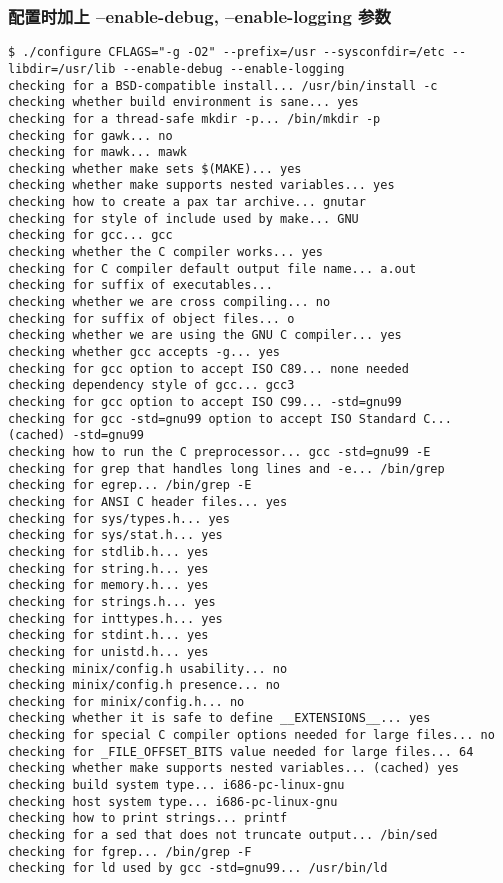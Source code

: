 \documentclass[11pt,a4paper]{article}
\begin{document}
\subsubsection{配置时加上 --enable-debug, --enable-logging 参数}

{\begin{shaded}\begin{verbatim}
$ ./configure CFLAGS="-g -O2" --prefix=/usr --sysconfdir=/etc --libdir=/usr/lib --enable-debug --enable-logging
checking for a BSD-compatible install... /usr/bin/install -c
checking whether build environment is sane... yes
checking for a thread-safe mkdir -p... /bin/mkdir -p
checking for gawk... no
checking for mawk... mawk
checking whether make sets $(MAKE)... yes
checking whether make supports nested variables... yes
checking how to create a pax tar archive... gnutar
checking for style of include used by make... GNU
checking for gcc... gcc
checking whether the C compiler works... yes
checking for C compiler default output file name... a.out
checking for suffix of executables... 
checking whether we are cross compiling... no
checking for suffix of object files... o
checking whether we are using the GNU C compiler... yes
checking whether gcc accepts -g... yes
checking for gcc option to accept ISO C89... none needed
checking dependency style of gcc... gcc3
checking for gcc option to accept ISO C99... -std=gnu99
checking for gcc -std=gnu99 option to accept ISO Standard C... (cached) -std=gnu99
checking how to run the C preprocessor... gcc -std=gnu99 -E
checking for grep that handles long lines and -e... /bin/grep
checking for egrep... /bin/grep -E
checking for ANSI C header files... yes
checking for sys/types.h... yes
checking for sys/stat.h... yes
checking for stdlib.h... yes
checking for string.h... yes
checking for memory.h... yes
checking for strings.h... yes
checking for inttypes.h... yes
checking for stdint.h... yes
checking for unistd.h... yes
checking minix/config.h usability... no
checking minix/config.h presence... no
checking for minix/config.h... no
checking whether it is safe to define __EXTENSIONS__... yes
checking for special C compiler options needed for large files... no
checking for _FILE_OFFSET_BITS value needed for large files... 64
checking whether make supports nested variables... (cached) yes
checking build system type... i686-pc-linux-gnu
checking host system type... i686-pc-linux-gnu
checking how to print strings... printf
checking for a sed that does not truncate output... /bin/sed
checking for fgrep... /bin/grep -F
checking for ld used by gcc -std=gnu99... /usr/bin/ld

\end{verbatim}
\end{shaded}}
\end{document}
